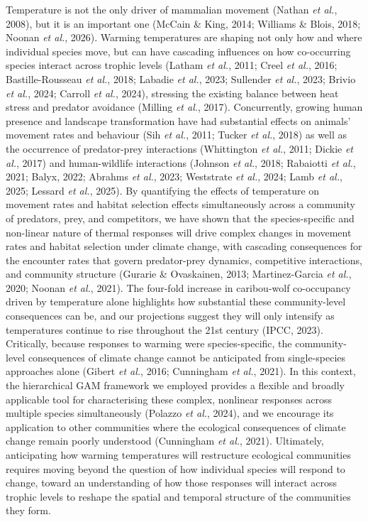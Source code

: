 \documentclass[
  12pt,
]{article}
\begin{document}
Temperature is not the only driver of mammalian movement (Nathan \emph{et al.}, 2008), but it is an important one (McCain \& King, 2014; Williams \& Blois, 2018; Noonan \emph{et al.}, 2026). Warming temperatures are shaping not only how and where individual species move, but can have cascading influences on how co-occurring species interact across trophic levels (Latham \emph{et al.}, 2011; Creel \emph{et al.}, 2016; Bastille-Rousseau \emph{et al.}, 2018; Labadie \emph{et al.}, 2023; Sullender \emph{et al.}, 2023; Brivio \emph{et al.}, 2024; Carroll \emph{et al.}, 2024), stressing the existing balance between heat stress and predator avoidance (Milling \emph{et al.}, 2017). Concurrently, growing human presence and landscape transformation have had substantial effects on animals' movement rates and behaviour (Sih \emph{et al.}, 2011; Tucker \emph{et al.}, 2018) as well as the occurrence of predator-prey interactions (Whittington \emph{et al.}, 2011; Dickie \emph{et al.}, 2017) and human-wildlife interactions (Johnson \emph{et al.}, 2018; Rabaiotti \emph{et al.}, 2021; Balyx, 2022; Abrahms \emph{et al.}, 2023; Weststrate \emph{et al.}, 2024; Lamb \emph{et al.}, 2025; Lessard \emph{et al.}, 2025). By quantifying the effects of temperature on movement rates and habitat selection effects simultaneously across a community of predators, prey, and competitors, we have shown that the species-specific and non-linear nature of thermal responses will drive complex changes in movement rates and habitat selection under climate change, with cascading consequences for the encounter rates that govern predator-prey dynamics, competitive interactions, and community structure (Gurarie \& Ovaskainen, 2013; Martinez-Garcia \emph{et al.}, 2020; {Noonan \emph{et al.}}, 2021). The four-fold increase in caribou-wolf co-occupancy driven by temperature alone highlights how substantial these community-level consequences can be, and our projections suggest they will only intensify as temperatures continue to rise throughout the 21st century (IPCC, 2023). Critically, because responses to warming were species-specific, the community-level consequences of climate change cannot be anticipated from single-species approaches alone (Gibert \emph{et al.}, 2016; Cunningham \emph{et al.}, 2021). In this context, the hierarchical GAM framework we employed provides a flexible and broadly applicable tool for characterising these complex, nonlinear responses across multiple species simultaneously (Polazzo \emph{et al.}, 2024), and we encourage its application to other communities where the ecological consequences of climate change remain poorly understood (Cunningham \emph{et al.}, 2021). Ultimately, anticipating how warming temperatures will restructure ecological communities requires moving beyond the question of how individual species will respond to change, toward an understanding of how those responses will interact across trophic levels to reshape the spatial and temporal structure of the communities they form.
\end{document}
